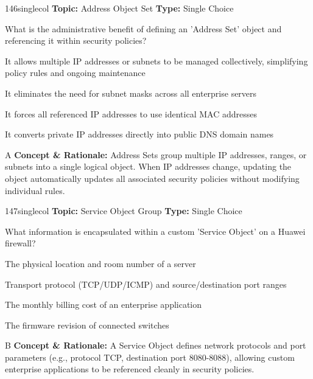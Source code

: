 \begin{qcard}{146}{singlecol}
\textcolor{darkslate!75}{\small\textbf{Topic:} Address Object Set \hfill \textbf{Type:} Single Choice}\vspace{0.4em}\par
What is the administrative benefit of defining an 'Address Set' object and referencing it within security policies?
\begin{qoptions}
\item It allows multiple IP addresses or subnets to be managed collectively, simplifying policy rules and ongoing maintenance
\item It eliminates the need for subnet masks across all enterprise servers
\item It forces all referenced IP addresses to use identical MAC addresses
\item It converts private IP addresses directly into public DNS domain names
\end{qoptions}
\end{qcard}
\nopagebreak
\begin{explainbox}{A}
\textbf{Concept \& Rationale:} Address Sets group multiple IP addresses, ranges, or subnets into a single logical object. When IP addresses change, updating the object automatically updates all associated security policies without modifying individual rules.
\end{explainbox}

\begin{qcard}{147}{singlecol}
\textcolor{darkslate!75}{\small\textbf{Topic:} Service Object Group \hfill \textbf{Type:} Single Choice}\vspace{0.4em}\par
What information is encapsulated within a custom 'Service Object' on a Huawei firewall?
\begin{qoptions}
\item The physical location and room number of a server
\item Transport protocol (TCP/UDP/ICMP) and source/destination port ranges
\item The monthly billing cost of an enterprise application
\item The firmware revision of connected switches
\end{qoptions}
\end{qcard}
\nopagebreak
\begin{explainbox}{B}
\textbf{Concept \& Rationale:} A Service Object defines network protocols and port parameters (e.g., protocol TCP, destination port 8080-8088), allowing custom enterprise applications to be referenced cleanly in security policies.
\end{explainbox}

